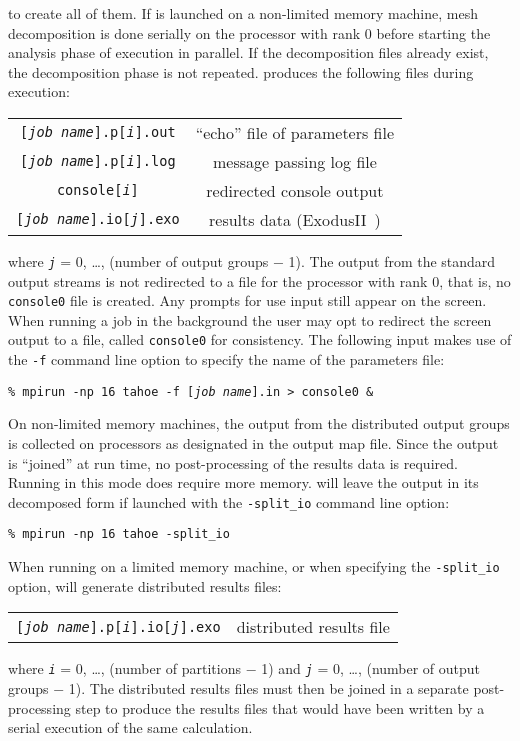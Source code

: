 to create all of them.  If \tahoe is launched on a non-limited memory
machine, mesh decomposition is done serially on the processor with rank 0
before starting the analysis phase of execution in parallel.  If the
decomposition files already exist, the decomposition phase is not repeated. 
\tahoe produces the following files during execution:
\begin{center}
\begin{tabular}[c]{c c}
 \parbox[b]{3.0in}{\raggedleft \texttt{[\textsl{job name}].p[\textsl{i}].out}}
&\parbox[b]{3.0in}{``echo'' file of parameters file}\\
 \parbox[b]{3.0in}{\raggedleft \texttt{[\textsl{job nam}e].p[\textsl{i}].log}}
&\parbox[b]{3.0in}{message passing log file}\\
 \parbox[b]{3.0in}{\raggedleft \texttt{console[\textsl{i}]}}
&\parbox[b]{3.0in}{redirected console output}\\
 \parbox[b]{3.0in}{\raggedleft \texttt{[\textsl{job name}].io[\textsl{j}].exo}}
&\parbox[b]{3.0in}{results data (\textsf{ExodusII}~\cite{exodusII})}
\end{tabular}
\end{center}
where \texttt{\textsl{j}} = 0, \ldots, (number of output groups $-$ 1).  
The output from the
standard output streams is not redirected to a file for the processor with
rank 0, that is, no \texttt{console0} file is created.  Any prompts for use input
still appear on the screen.  When running a job in the background the user
may opt to redirect the screen output to a file, called \texttt{console0} for
consistency.  The following input makes use of the \texttt{-f} command line option
to specify the name of the parameters file:
\begin{center}
\texttt{\% mpirun -np 16 tahoe -f [\textsl{job name}].in \textgreater~console0 \&}
\end{center}
On non-limited memory machines, the output from the distributed output
groups is collected on processors as designated in the output map file. 
Since the output is ``joined'' at run time, no post-processing of the results
data is required.  Running \tahoe in this mode does require more memory. 
\tahoe will leave the output in its decomposed form if launched with the
\texttt{-split\_io} command line option:
\begin{center}
\texttt{\% mpirun -np 16 tahoe -split\_io}
\end{center}
When running on a limited memory machine, or when specifying the 
\texttt{-split\_io}
option, \tahoe will generate distributed results files:
\begin{center}
\begin{tabular}[c]{c c}
 \parbox[b]{3.0in}{\raggedleft \texttt{[\textsl{job name}].p[\textsl{i}].io[\textsl{j}].exo}}
&\parbox[b]{3.0in}{distributed results file}
\end{tabular}
\end{center}
where \texttt{\textsl{i}} = 0, \ldots, (number of partitions $-$ 1) and 
\texttt{\textsl{j}} = 0, \ldots, (number of output
groups $-$ 1).  The distributed results files must then be joined in a
separate post-processing step to produce the results files that would have
been written by a serial execution of the same calculation.

